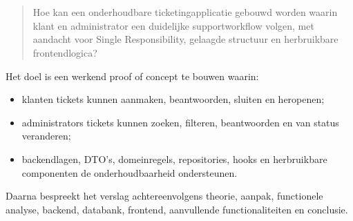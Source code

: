 \section{}%
\label{sec:onderzoeksvraag}
\label{sec:onderzoeksdoelstelling}


\begin{quote}\small
Hoe kan een onderhoudbare ticketingapplicatie gebouwd worden waarin klant en administrator een duidelijke supportworkflow volgen, met aandacht voor Single Responsibility, gelaagde structuur en herbruikbare frontendlogica?
\end{quote}

Het doel is een werkend proof of concept te bouwen waarin:

\begin{itemize}[nosep, leftmargin=*]
  \item klanten tickets kunnen aanmaken, beantwoorden, sluiten en heropenen;
  \item administrators tickets kunnen zoeken, filteren, beantwoorden en van status veranderen;
  \item backendlagen, DTO's, domeinregels, repositories, hooks en herbruikbare componenten de onderhoudbaarheid ondersteunen.
\end{itemize}

Daarna bespreekt het verslag achtereenvolgens theorie, aanpak, functionele analyse, backend, databank, frontend, aanvullende functionaliteiten en conclusie.
